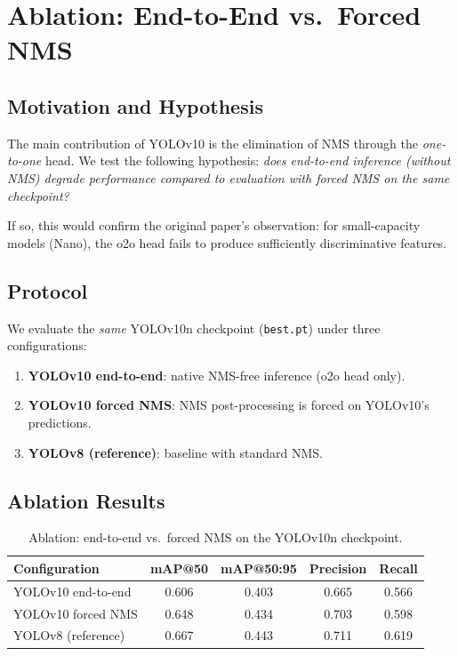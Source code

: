 \documentclass[11pt,a4paper]{article}
\begin{document}
\section{Ablation: End-to-End vs.\ Forced NMS}

\subsection{Motivation and Hypothesis}

The main contribution of YOLOv10 is the elimination of NMS through the \emph{one-to-one} head. We test the following hypothesis: \emph{does end-to-end inference (without NMS) degrade performance compared to evaluation with forced NMS on the same checkpoint?}

If so, this would confirm the original paper's observation: for small-capacity models (Nano), the o2o head fails to produce sufficiently discriminative features.

\subsection{Protocol}

We evaluate the \emph{same} YOLOv10n checkpoint (\texttt{best.pt}) under three configurations:
\begin{enumerate}[noitemsep]
  \item \textbf{YOLOv10 end-to-end}: native NMS-free inference (o2o head only).
  \item \textbf{YOLOv10 forced NMS}: NMS post-processing is forced on YOLOv10's predictions.
  \item \textbf{YOLOv8 (reference)}: baseline with standard NMS.
\end{enumerate}

\subsection{Ablation Results}

\begin{table}[H]
\centering
\caption{Ablation: end-to-end vs.\ forced NMS on the YOLOv10n checkpoint.}
\label{tab:ablation}
\begin{tabular}{lcccc}
\toprule
\textbf{Configuration} & \textbf{mAP@50} & \textbf{mAP@50:95} & \textbf{Precision} & \textbf{Recall} \\
\midrule
YOLOv10 end-to-end  & 0.606 & 0.403 & 0.665 & 0.566 \\
YOLOv10 forced NMS  & 0.648 & 0.434 & 0.703 & 0.598 \\
YOLOv8 (reference)  & 0.667 & 0.443 & 0.711 & 0.619 \\
\bottomrule
\end{tabular}
\end{table}
\end{document}
